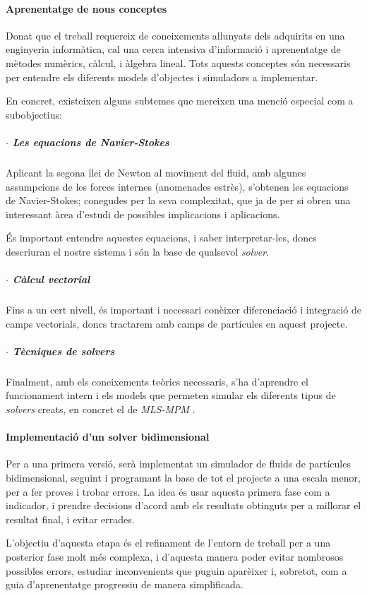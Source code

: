 \documentclass[a4paper]{report}
\begin{document}
	\paragraph{\quad Aprenentatge de nous conceptes} Donat que el treball requereix de coneixements allunyats dels adquirits en una enginyeria informàtica, cal una cerca intensiva d'informació i aprenentatge de mètodes numèrics, càlcul, i àlgebra lineal. Tots aquests conceptes són necessaris per entendre els diferents models d'objectes i simuladors a implementar. \par
	En concret, existeixen alguns subtemes que mereixen una menció especial com a subobjectius:
	\subparagraph[Navier-Stokes]{\qquad $\cdot$ Les equacions de Navier-Stokes} Aplicant la segona llei de Newton al moviment del fluid, amb algunes assumpcions de les forces internes (anomenades estrès), s'obtenen les equacions de Navier-Stokes; conegudes per la seva complexitat, que ja de per si obren una interessant àrea d'estudi de possibles implicacions i aplicacions.
	\par
	És important entendre aquestes equacions, i saber interpretar-les, doncs descriuran el nostre sistema i són la base de qualsevol \textit{solver}.
	\subparagraph[Càlcul vectorial]{\qquad $\cdot$ Càlcul vectorial} Fins a un cert nivell, és important i necessari conèixer diferenciació i integració de camps vectorials, doncs tractarem amb camps de partícules en aquest projecte.
	\subparagraph[Tècniques de solvers]{\qquad $\cdot$ Tècniques de solvers} Finalment, amb els coneixements teòrics necessaris, s'ha d'aprendre el funcionament intern i els models que permeten simular els diferents tipus de \textit{solvers} creats, en concret el de \textit{MLS-MPM} \cite{hu2018mlsmpmcpic}.
	
	\paragraph{\quad Implementació d'un solver bidimensional} Per a una primera versió, serà implementat un simulador de fluids de partícules bidimensional, seguint\cite{Hu,hu2018mlsmpmcpic} i programant la base de tot el projecte a una escala menor, per a fer proves i trobar errors. La idea és usar aquesta primera fase com a indicador, i prendre decisions d'acord amb els resultats obtinguts per a millorar el resultat final, i evitar errades. \par
	L'objectiu d'aquesta etapa és el refinament de l'entorn de treball per a una posterior fase molt més complexa, i d'aquesta manera poder evitar nombrosos possibles errors, estudiar inconvenients que puguin aparèixer i, sobretot, com a guia d'aprenentatge progressiu de manera simplificada. 
	
\end{document}
